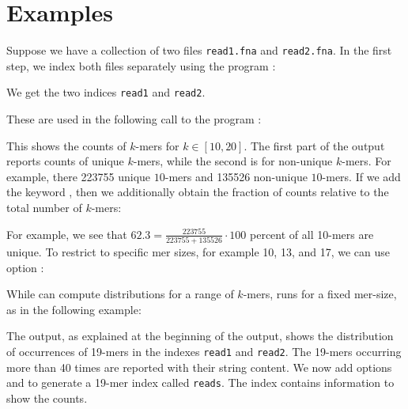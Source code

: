 \documentclass[12pt]{article}
\newcommand{\VMERSTAT}[0]{\Programname{vmerstat}\xspace}
\newcommand{\VMERDIST}[0]{\Programname{vmerdistrib}\xspace}
\begin{document}
\section{Examples}

Suppose we have a collection of two files \texttt{read1.fna} and
\texttt{read2.fna}. In the first step, we index 
both files separately using the program \MKV:



We get the two indices \texttt{read1} and \texttt{read2}.

These are used in the following call to the program \VMERDIST:


This shows the counts of $k$-mers for $k\in[10,20]$. The first part of the
output reports counts of unique $k$-mers, while the second is for
non-unique $k$-mers. For example, there 223755 unique $10$-mers 
and 135526 non-unique $10$-mers. If we add the keyword 
, then we additionally obtain the fraction
of counts relative to the total number of $k$-mers:


For example, we see that $62.3=\frac{223755}{223755+135526}\cdot 100$
percent of all 10-mers are unique. To restrict to specific mer sizes, for
example 10, 13, and 17, we can use option :


While \VMERDIST can compute distributions for a range of 
$k$-mers, \VMERSTAT runs for a fixed mer-size, as in the following example:


The output, as explained at the beginning of the output, shows the
distribution of occurrences of 19-mers in the indexes
\texttt{read1} and \texttt{read2}. The 19-mers occurring more 
than 40 times are reported with their string content.
We now add options  and  to 
generate a 19-mer index called \texttt{reads}. The index contains
information to show the counts.
\end{document}
